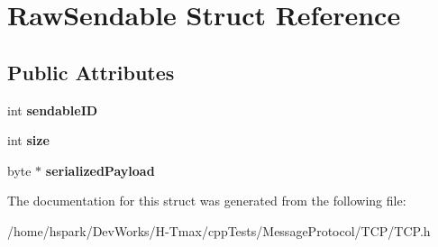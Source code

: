 \hypertarget{structRawSendable}{\section{Raw\-Sendable Struct Reference}
\label{structRawSendable}
}
\subsection*{Public Attributes}
\begin{DoxyCompactItemize}
\item 
\hypertarget{structRawSendable_ac8414dac88d017ad03f0d8f37cc99375}{int {\bfseries sendable\-I\-D}}\label{structRawSendable_ac8414dac88d017ad03f0d8f37cc99375}

\item 
\hypertarget{structRawSendable_ae1daa08239b08632a5ca6a7b626e9265}{int {\bfseries size}}\label{structRawSendable_ae1daa08239b08632a5ca6a7b626e9265}

\item 
\hypertarget{structRawSendable_ac607e993b6535e28ddeb2fbe498d0944}{byte $\ast$ {\bfseries serialized\-Payload}}\label{structRawSendable_ac607e993b6535e28ddeb2fbe498d0944}

\end{DoxyCompactItemize}


The documentation for this struct was generated from the following file\-:\begin{DoxyCompactItemize}
\item 
/home/hspark/\-Dev\-Works/\-H-\/\-Tmax/cpp\-Tests/\-Message\-Protocol/\-T\-C\-P/T\-C\-P.\-h\end{DoxyCompactItemize}
